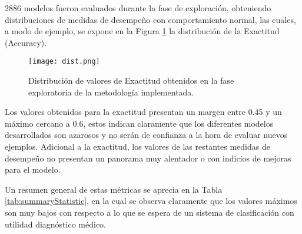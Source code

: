 2886 modelos fueron evaluados durante la fase de exploración, obteniendo distribuciones de medidas de desempeño con comportamiento normal, las cuales, a modo de ejemplo, se expone en la Figura \ref{accuracyBad} la distribución de la Exactitud (Accuracy). 

\begin{figure}[!h]
	\centering
	\texttt{[image: dist.png]}
	\caption{Distribución de valores de Exactitud obtenidos en la fase exploratoria de la metodología implementada.}
	\label{accuracyBad}
\end{figure}

Los valores obtenidos para la exactitud presentan un margen entre 0.45 y un máximo cercano a 0.6, estos indican claramente que los diferentes modelos desarrollados son azarosos y no serán de confianza a la hora de evaluar nuevos ejemplos. Adicional a la exactitud, los valores de las restantes medidas de desempeño no presentan un panorama muy alentador o con indicios de mejoras para el modelo.

Un resumen general de estas métricas se aprecia en la Tabla \ref{tab:summaryStatistic}, en la cual se observa claramente que los valores máximos son muy bajos con respecto a lo que se espera de un sistema de clasificación con utilidad diagnóstico médico.

